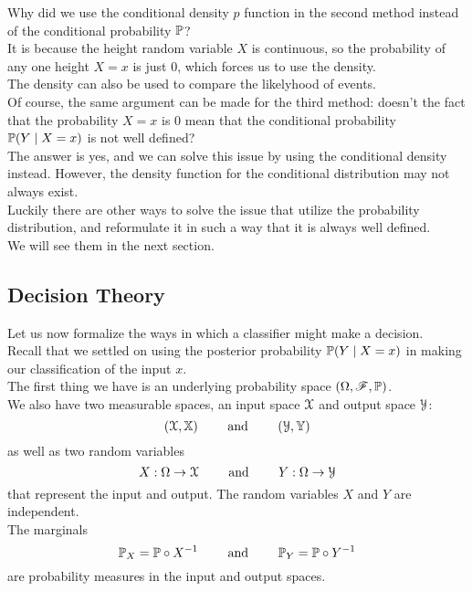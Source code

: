 \documentclass[12pt]{article}
\begin{document}
Why did we use the conditional
density $p$ function
in the second method instead of
the conditional probability $\mathbb{P}$? \\
It is because the height random variable
$X$ is continuous,
so the probability of any one
height $X = x$ is just $0$,
which forces us to use the density. \\
The density can also be used to compare
the likelyhood of events. \\

Of course, the same argument
can be made for the third method:
doesn't the fact that the probability
$X = x$ is $0$
mean that the conditional
probability $\mathbb{P}(Y \mid X = x)$
is not well defined? \\
The answer is yes,
and we can solve this issue by using
the conditional density instead.
However, the density function
for the conditional distribution
may not always exist. \\
Luckily there are other ways to solve 
the issue that utilize the probability
distribution, and reformulate it in
such a way that it is always well
defined. \\
We will see them in the next section. \\

\newpage

\subsection*{Decision Theory}

Let us now formalize the ways
in which a classifier might
make a decision. \\
Recall that we settled on using
the posterior probability
$\mathbb{P}(Y \mid X = x)$
in making our classification
of the input $x$. \\

The first thing we have
is an underlying probability
space
$(\Omega, \mathscr{F}, \mathbb{P})$. \\

We also have two measurable
spaces, an input space $\mathcal{X}$
and output space $\mathcal{Y}$:
\[ (\mathcal{X}, \mathbb{X}) \qquad \text{ and } \qquad (\mathcal{Y}, \mathbb{Y}) \]
as well as two random variables
\[ X: \Omega \to \mathcal{X} \qquad \text{ and } \qquad 
Y: \Omega \to \mathcal{Y} \]
that represent the input
and output.
The random variables $X$ and $Y$
are independent. \\

The marginals
\[ \mathbb{P}_X = \mathbb{P} \circ X^{-1} 
\qquad \text{ and } \qquad \mathbb{P}_Y = \mathbb{P} \circ Y^{-1} \]
are probability measures
in the input and output spaces. \\
\end{document}
